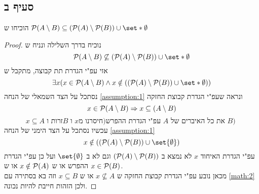 \documentclass{article}
\DeclarePairedDelimiter\set\{\}
\begin{document}
	\subsection*{סעיף ב}
	הוכיחו ש $\PP(A \sub B) \subseteq (\PP(A) \sub \PP(B)) \cup \set*{\emptyset}$
	\begin{proof}
		נוכיח בדרך השלילה ונניח ש
		\[
			\PP(A \sub B) \not\subseteq (\PP(A) \sub \PP(B)) \cup \set*{\emptyset}
		\]
		אזי עפ"י הגדרת תת קבוצה, מתקבל ש
		\begin{equation} \label{assumption:1}
			\exists x (x \in \PP(A \sub B) \land
					x \notin ((\PP(A) \sub \PP(B)) \cup \set*{\emptyset}))
		\end{equation}
		נסתכל על הצד השמאלי של הנחה
\ref{assumption:1} ונראה שעפ"י הגדרת קבוצת החזקה
		\[
			x \in \mathcal{P}(A \setminus B) \Rightarrow
			x \subseteq (A \setminus B)
		\]
		\begin{equation} \label{math:2}
			x \subseteq A \text{ זרות  ו} B  \text{ ו }  x \text{עפ"י הגדרת ההפרש(חיסרנו מ $A$ את כל האיברים של $B$) }
		\end{equation}
עכשיו נסתכל על הצד הימני של הנחה \ref{assumption:1}
		\[
			x \notin ((\PP(A) \sub \PP(B)) \cup \set{\emptyset})
		\]
		עפ"י הגדרת האיחוד $x$  לא נמצא ב $(\mathcal{P}(A) \setminus \mathcal{P}(B))$ וגם לא ב $\set{\emptyset}$
		ועל כן עפ"י הגדרת ההפרש או ש $x \notin \mathcal{P}(A)$ או ש $x \in \mathcal{P}(B)$. \\
 		מכאן נובע עפ"י הגדרת קבוצת החזקה ש $x \not \subseteq A$  או ש $x \subseteq B$
		  וזה בא בסתירה עם \ref{math:2} \\
		   ולכן הזהות חייבת להיות נכונה.
	\end{proof}

	\pagebreak
\end{document}
